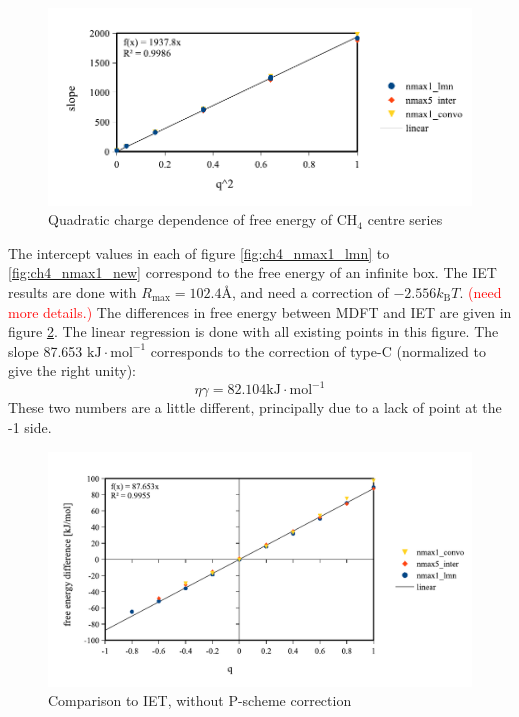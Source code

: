 \begin{figure}[H]
\begin{centering}
\includegraphics[bb=0bp 20bp 425bp 178bp,scale=0.6]{_figure/results/ch4_slope}
\par\end{centering}
\caption{Quadratic charge dependence of free energy of $\mathrm{C}\mathrm{H}_{4}$
centre series\label{fig:Quadratic-charge-dependence}}
\end{figure}
The intercept values in each of figure \ref{fig:ch4_nmax1_lmn} to
\ref{fig:ch4_nmax1_new} correspond to the free energy of an infinite
box. The \acs{IET} results are done with $R_{\max}=102.4\textrm{Å}$,
and need a correction of $-2.556k_{\mathrm{B}}T$. \textcolor{red}{(need
more details.)} The differences in free energy between MDFT and IET
are given in figure \ref{fig:Comparison-to-IET,without-correction}.
The linear regression is done with all existing points in this figure.
The slope 87.653 $\mathrm{kJ}\cdot\mathrm{mol^{-1}}$ corresponds
to the correction of type-C (normalized to give the right unity):
\begin{equation}
\eta\gamma=82.104\mathrm{kJ}\cdot\mathrm{mol^{-1}}\label{eq:eta-gamma}
\end{equation}
These two numbers are a little different, principally due to a lack
of point at the -1 side.

\begin{figure}[h]
\begin{centering}
\includegraphics[bb=0bp 20bp 510bp 263bp,scale=0.6]{_figure/results/ch4_diff_energy}
\par\end{centering}
\caption{Comparison to IET, without P-scheme correction\label{fig:Comparison-to-IET,without-correction}}
\end{figure}


